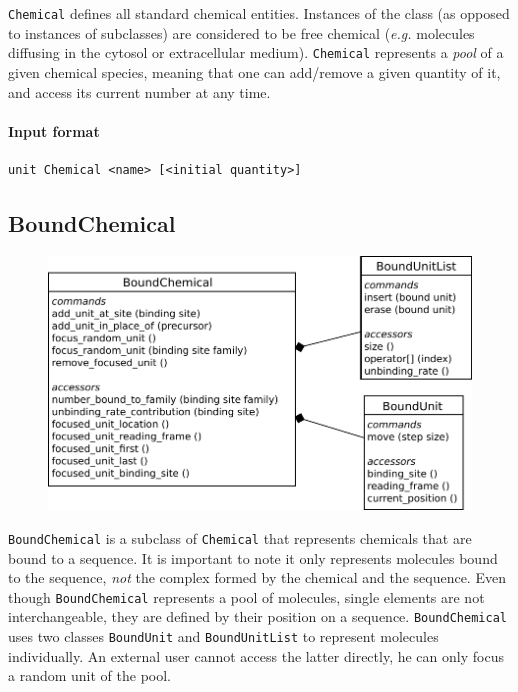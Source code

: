 \documentclass[12pt]{article}
\theoremstyle{definition}
\theoremstyle{remark}
\numberwithin{equation}{section}
\begin{document}
\texttt{Chemical} defines all standard chemical entities. Instances of the class (as opposed to instances of subclasses) are considered to be free chemical (\textit{e.g.} molecules diffusing in the cytosol or extracellular medium). \texttt{Chemical} represents a \emph{pool} of a given chemical species, meaning that one can add/remove a given quantity of it, and access its current number at any time.

\paragraph{Input format}
\begin{verbatim}
unit Chemical <name> [<initial quantity>]
\end{verbatim}

\subsection{BoundChemical}

\begin{figure}[!ht]
	\centering
	\includegraphics[scale=0.8]{boundchemical}
\end{figure}

\texttt{BoundChemical} is a subclass of \texttt{Chemical} that represents chemicals that are bound to a sequence. It is important to note it only represents molecules bound to the sequence, \emph{not} the complex formed by the chemical and the sequence. Even though \texttt{BoundChemical} represents a pool of molecules, single elements are not interchangeable, they are defined by their position on a sequence. \texttt{BoundChemical} uses two classes \texttt{BoundUnit} and \texttt{BoundUnitList} to represent molecules individually. An external user cannot access the latter directly, he can only focus a random unit of the pool.
\end{document}
